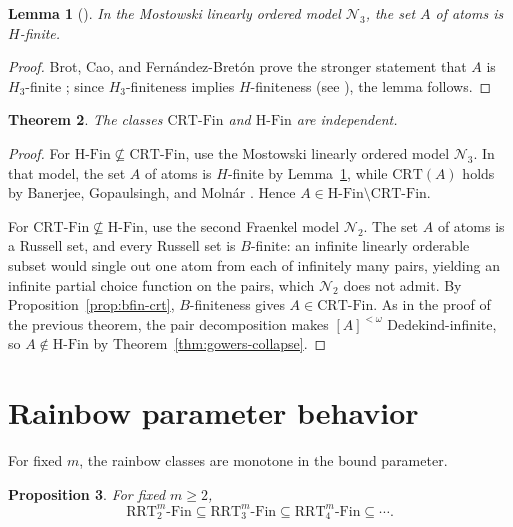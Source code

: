 \documentclass[11pt]{amsart}
\newtheorem{theorem}{Theorem}[section]
\newtheorem{proposition}[theorem]{Proposition}
\newtheorem{lemma}[theorem]{Lemma}
\theoremstyle{definition}
\newcommand{\HFin}{\mathrm{H\text{-}Fin}}
\newcommand{\RRT}{\mathrm{RRT}}
\newcommand{\CRT}{\mathrm{CRT}}
\newcommand{\NN}{\mathcal{N}}
\newcommand{\RRTFin}[2]{\RRT^{#1}_{#2}\text{-}\mathrm{Fin}}
\newcommand{\CRTFin}{\CRT\text{-}\mathrm{Fin}}
\begin{document}
\begin{lemma}[{\cite[Proposition~4.17]{BCF}}]\label{lem:n3-hfin}
In the Mostowski linearly ordered model \(\NN_3\), the set \(A\) of atoms is \(H\)-finite.
\end{lemma}

\begin{proof}
Brot, Cao, and Fern\'andez-Bret\'on prove the stronger statement that \(A\) is \(H_3\)-finite \cite[Proposition~4.17]{BCF}; since \(H_3\)-finiteness implies \(H\)-finiteness (see \cite[Section~3]{BCF}), the lemma follows.
\end{proof}

\begin{theorem}\label{thm:crt-hfin-indep}
The classes \(\CRTFin\) and \(\HFin\) are independent.
\end{theorem}

\begin{proof}
For \(\HFin\not\subseteq\CRTFin\), use the Mostowski linearly ordered model \(\NN_3\).  In that model, the set \(A\) of atoms is \(H\)-finite by Lemma~\ref{lem:n3-hfin}, while \(\CRT(A)\) holds by Banerjee, Gopaulsingh, and Moln\'ar \cite[Theorem~4.8(2)]{BGM}.  Hence \(A\in\HFin\setminus\CRTFin\).

For \(\CRTFin\not\subseteq\HFin\), use the second Fraenkel model \(\NN_2\).  The set \(A\) of atoms is a Russell set, and every Russell set is \(B\)-finite: an infinite linearly orderable subset would single out one atom from each of infinitely many pairs, yielding an infinite partial choice function on the pairs, which \(\NN_2\) does not admit.  By Proposition~\ref{prop:bfin-crt}, \(B\)-finiteness gives \(A\in\CRTFin\).  As in the proof of the previous theorem, the pair decomposition makes \([A]^{<\omega}\) Dedekind-infinite, so \(A\notin\HFin\) by Theorem~\ref{thm:gowers-collapse}.
\end{proof}

\section{Rainbow parameter behavior}\label{sec:parameter}

For fixed \(m\), the rainbow classes are monotone in the bound parameter.

\begin{proposition}\label{prop:rrt-n-monotone}
For fixed \(m\geq 2\),
\[
    \RRTFin{m}{2}
    \subseteq
    \RRTFin{m}{3}
    \subseteq
    \RRTFin{m}{4}
    \subseteq\cdots.
\]
\end{proposition}
\end{document}

